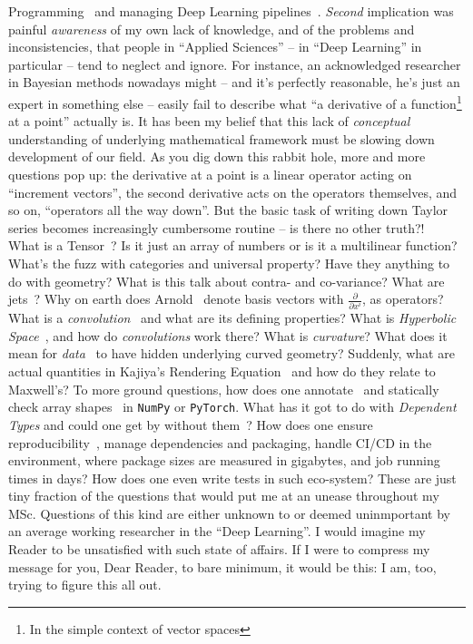 Programming~\citep{dexlang,mcdonellGPU} and managing Deep Learning
pipelines~\citep{mokhov2018build}.  \emph{Second} implication was painful
\emph{awareness} of my own lack of knowledge, and of the problems and
inconsistencies, that people in ``Applied Sciences'' -- in ``Deep Learning'' in
particular -- tend to neglect and ignore.  For instance, an acknowledged
researcher in Bayesian methods nowadays might -- and it's perfectly reasonable,
he's just an expert in something else -- easily fail to describe what ``a
derivative of a function\footnote{In the simple context of vector spaces} at a
point'' actually is. It has been my belief that this lack of \emph{conceptual}
understanding of underlying mathematical framework must be slowing down
development of our field. As you dig down this rabbit hole, more and more
questions pop up: the derivative at a point is a linear operator acting on
``increment vectors'', the second derivative acts on the operators themselves,
and so on, ``operators all the way down''. But the basic task of writing down
Taylor series becomes increasingly cumbersome routine -- is there no other
truth?!~\citep{elliott2018simple} What is a
Tensor~\citep{bradley2020interface}? Is it just an array of numbers or is it a
multilinear function? What's the fuzz with categories and universal property?
Have they anything to do with geometry?  What is this talk about contra- and
co-variance?  What are jets~\citep{betancourt2018geometric}?  Why on earth does
Arnold~\citep{arnoldPDEs} denote basis vectors with \( \frac{\partial}{\partial
x^i} \), as operators?  What is a
\emph{convolution}~\citep{feichtingerFAHA,cohen2018general,e2cnn} and what are
its defining properties? What is \emph{Hyperbolic Space}~\citep{ganeaHNNs}, and
how do \emph{convolutions} work there? What is \emph{curvature}? What does it
mean for \emph{data}~\citep{khrulkov} to have hidden underlying curved
geometry? Suddenly, what are actual quantities in Kajiya's Rendering
Equation~\citep{kajiya1986rendering} and how do they relate to Maxwell's? To
more ground questions, how does one
annotate~\citep{documentationResearch,struturingDocumentation,doctest,doctestRust,doctestCpp}
and statically check array shapes~\citep{rush2019tensor,rush2019tensor2} in
\texttt{NumPy} or \texttt{PyTorch}. What has it got to do with
\emph{Dependent Types} and could one get by without them~\citep{dexlang,slap}?
How does one ensure
reproducibility~\citep{inriaSacred,catalyst,pytorchLightning,xinLiangPipelines,},
manage dependencies and packaging, handle CI/CD in the environment, where
package sizes are measured in gigabytes, and job running times in days?  How
does one even write tests in such eco-system?  These are just tiny fraction of
the questions that would put me at an unease throughout my MSc. Questions of
this kind are either unknown to or deemed uninmportant by an average working
researcher in the ``Deep Learning''. I would imagine my Reader to be
unsatisfied with such state of affairs. If I were to compress my message for
you, Dear Reader, to bare minimum, it would be this: I am, too, trying to
figure this all out.

